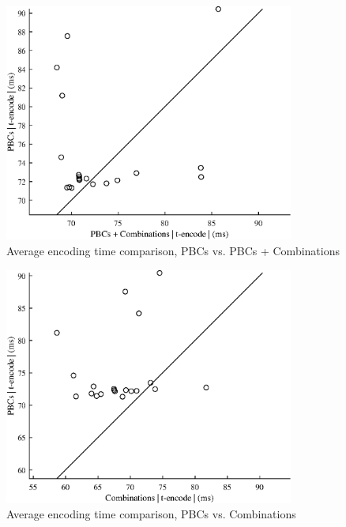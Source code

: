 {
\renewcommand{\figurename}{Plot}
\begin{figure}
    \centering
    \includegraphics[width = 0.85\textwidth]{Figures/opt_encode_2_1.eps}
    \caption{Average encoding time comparison, PBCs vs. PBCs + Combinations}
    \label{opt_encode_2_1}
\end{figure}

\begin{figure}
    \centering
    \includegraphics[width = 0.85\textwidth]{Figures/opt_encode_3_1.eps}
    \caption{Average encoding time comparison, PBCs vs. Combinations}
    \label{opt_encode_3_1}
\end{figure}

}
